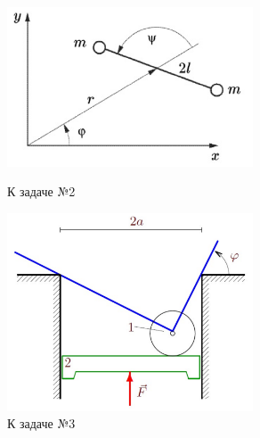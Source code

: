 



\begin{figure}[h]
    \centering
    \begin{minipage}[t]{0.45\textwidth}
        \begin{center}
            \includegraphics[width=0.65\textwidth]{figures/cw2.png}
        \end{center}
        \caption{К задаче №2}
        \label{cw_t2_2}
    \end{minipage}
    \hspace{0.5cm} 
    \begin{minipage}[t]{0.45\textwidth}
        \begin{center}
            \includegraphics[width=0.65\textwidth]{figures/cw3.png}
        \end{center}
        \caption{К задаче №3}
        \label{cw_t2_3}
    \end{minipage}
\end{figure}






